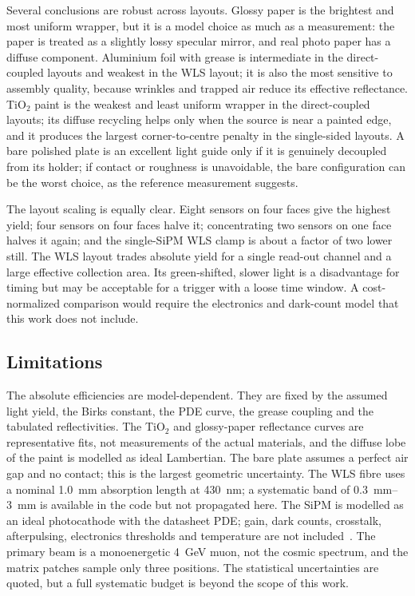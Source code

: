 \documentclass[preprint,12pt]{elsarticle}
\begin{document}
Several conclusions are robust across layouts. Glossy paper is the brightest and
most uniform wrapper, but it is a model choice as much as a measurement: the
paper is treated as a slightly lossy specular mirror, and real photo paper has a
diffuse component. Aluminium foil with grease is intermediate in the
direct-coupled layouts and weakest in the WLS layout; it is also the most
sensitive to assembly quality, because wrinkles and trapped air reduce its
effective reflectance. TiO$_2$ paint is the weakest and least uniform wrapper in
the direct-coupled layouts; its diffuse recycling helps only when the source is
near a painted edge, and it produces the largest corner-to-centre penalty in the
single-sided layouts. A bare polished plate is an excellent light guide only if
it is genuinely decoupled from its holder; if contact or roughness is
unavoidable, the bare configuration can be the worst choice, as the reference
measurement suggests.

The layout scaling is equally clear. Eight sensors on four faces give the
highest yield; four sensors on four faces halve it; concentrating two sensors on
one face halves it again; and the single-SiPM WLS clamp is about a factor of two
lower still. The WLS layout trades absolute yield for a single read-out channel
and a large effective collection area. Its green-shifted, slower light is a
disadvantage for timing but may be acceptable for a trigger with a loose time
window. A cost-normalized comparison would require the electronics and
dark-count model that this work does not include.

\subsection{Limitations}

The absolute efficiencies are model-dependent. They are fixed by the assumed
light yield, the Birks constant, the PDE curve, the grease coupling and the
tabulated reflectivities. The TiO$_2$ and glossy-paper reflectance curves are
representative fits, not measurements of the actual materials, and the diffuse
lobe of the paint is modelled as ideal Lambertian. The bare plate assumes a
perfect air gap and no contact; this is the largest geometric uncertainty. The
WLS fibre uses a nominal \SI{1.0}{\milli\meter} absorption length at
\SI{430}{\nano\meter}; a systematic band of \SIrange{0.3}{3}{\milli\meter} is
available in the code but not propagated here. The SiPM is modelled as an ideal
photocathode with the datasheet PDE; gain, dark counts, crosstalk,
afterpulsing, electronics thresholds and temperature are not
included~\cite{Anfimov2021}. The primary beam is a monoenergetic
\SI{4}{\giga\electronvolt} muon, not the cosmic spectrum, and the matrix patches
sample only three positions. The statistical uncertainties are quoted, but a
full systematic budget is beyond the scope of this work.
\end{document}
